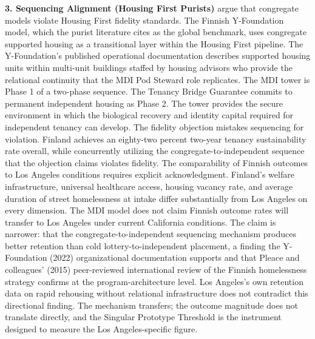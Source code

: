 \documentclass[12pt, letterpaper]{article}
\begin{document}
\textbf{3. Sequencing Alignment (Housing First Purists)} argue that congregate models violate Housing First fidelity standards. The Finnish Y-Foundation model, which the purist literature cites as the global benchmark, uses congregate supported housing as a transitional layer within the Housing First pipeline. The Y-Foundation's published operational documentation describes supported housing units within multi-unit buildings staffed by housing advisors who provide the relational continuity that the MDI Pod Steward role replicates. The MDI tower is Phase 1 of a two-phase sequence. The Tenancy Bridge Guarantee commits to permanent independent housing as Phase 2. The tower provides the secure environment in which the biological recovery and identity capital required for independent tenancy can develop. The fidelity objection mistakes sequencing for violation. Finland achieves an eighty-two percent two-year tenancy sustainability rate overall, while concurrently utilizing the congregate-to-independent sequence that the objection claims violates fidelity. The comparability of Finnish outcomes to Los Angeles conditions requires explicit acknowledgment. Finland's welfare infrastructure, universal healthcare access, housing vacancy rate, and average duration of street homelessness at intake differ substantially from Los Angeles on every dimension. The MDI model does not claim Finnish outcome rates will transfer to Los Angeles under current California conditions. The claim is narrower: that the congregate-to-independent sequencing mechanism produces better retention than cold lottery-to-independent placement, a finding the Y-Foundation (2022) organizational documentation supports and that Pleace and colleagues' (2015) peer-reviewed international review of the Finnish homelessness strategy confirms at the program-architecture level. Los Angeles's own retention data on rapid rehousing without relational infrastructure does not contradict this directional finding. The mechanism transfers; the outcome magnitude does not translate directly, and the Singular Prototype Threshold is the instrument designed to measure the Los Angeles-specific figure.
\end{document}
